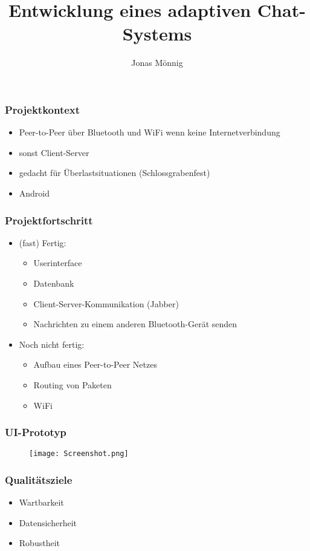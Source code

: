 \documentclass[accentcolor=tud4c,colorbacktitle]{tudbeamer}
\begin{document}
  \title{Entwicklung eines adaptiven Chat-Systems}
  \author{Jonas Mönnig}

  \begin{titleframe}
  \end{titleframe}
    \begin{frame}
      \frametitle{Projektkontext}
      \begin{itemize}
        \item Peer-to-Peer über Bluetooth und WiFi wenn keine Internetverbindung
        \item sonst Client-Server  
        \item gedacht für Überlastsituationen (Schlossgrabenfest) 
        \item Android
      \end{itemize}
    \end{frame}
    \begin{frame}
      \frametitle{Projektfortschritt}
      \begin{itemize}
        \item (fast) Fertig:
        \begin{itemize}
          \item Userinterface
          \item Datenbank
          \item Client-Server-Kommunikation (Jabber)
          \item Nachrichten zu einem anderen Bluetooth-Gerät senden
        \end{itemize}
      \end{itemize}
      \begin{itemize}
        \item Noch nicht fertig:
        \begin{itemize}
          \item Aufbau eines Peer-to-Peer Netzes
          \item Routing von Paketen
          \item WiFi
        \end{itemize}
      \end{itemize}
    \end{frame}
    \begin{frame}
      \frametitle{UI-Prototyp }
      \begin{figure}[ht!]
        \centering
        \texttt{[image: Screenshot.png]}
      \end{figure}
    \end{frame}
    \begin{frame}
      \frametitle{Qualitätsziele}
      \begin{itemize}
        \item Wartbarkeit
        \item Datensicherheit
        \item Robustheit
      \end{itemize}
    \end{frame}    
\end{document}
